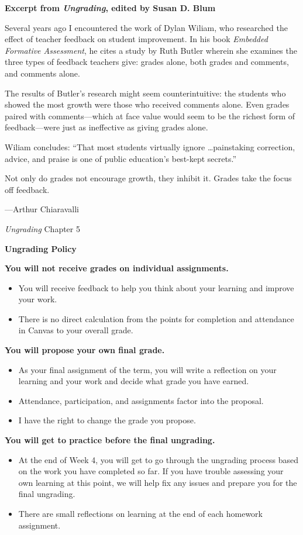 \documentclass[]{article}
\begin{document}
\newpage
\begin{TeacherMargin}
\noindent\textbf{Excerpt from \textit{Ungrading}, edited by Susan D. Blum}

Several years ago I encountered the work of Dylan Wiliam, who researched the effect of teacher feedback on student improvement. In his book \textit{Embedded Formative Assessment}, he cites a study by Ruth Butler wherein she examines the three types of feedback teachers give: grades alone, both grades and comments, and comments alone.

The results of Butler's research might seem counterintuitive: the students who showed the most growth were those who received comments alone. Even grades paired with comments---which at face value would seem to be the richest form of feedback---were just as ineffective as giving grades alone.

Wiliam concludes: ``That most students virtually ignore \dots painstaking correction, advice, and praise is one of public education's best-kept secrets.''

Not only do grades not encourage growth, they inhibit it. Grades take the focus off feedback.
\begin{flushright}
	---Arthur Chiaravalli
	
	\textit{Ungrading} Chapter 5
\end{flushright}
\end{TeacherMargin}
\begin{PresentSpace}
\begin{center}
	\textbf{Ungrading Policy}
\end{center}
\textbf{You will not receive grades on individual assignments.}
\begin{itemize}
	\item You will receive feedback to help you think about your learning and improve your work.
	\item There is no direct calculation from the points for completion and attendance in Canvas to your overall grade.
\end{itemize}
\textbf{You will propose your own final grade.}
\begin{itemize}
	\item As your final assignment of the term, you will write a reflection on your learning and your work and decide what grade you have earned.
	\item Attendance, participation, and assignments factor into the proposal.
	\item I have the right to change the grade you propose.
\end{itemize}
\textbf{You will get to practice before the final ungrading.}
\begin{itemize}
	\item At the end of Week 4, you will get to go through the ungrading process based on the work you have completed so far. If you have trouble assessing your own learning at this point, we will help fix any issues and prepare you for the final ungrading.
	\item There are small reflections on learning at the end of each homework assignment.
\end{itemize}
\end{PresentSpace}
\end{document}
